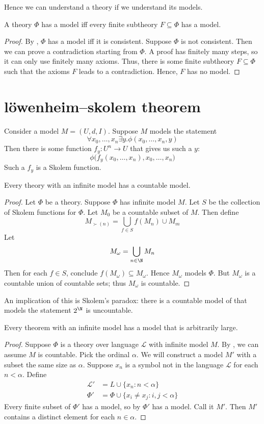 \documentclass{scrbook}
\begin{document}
Hence we can understand a theory if we understand its models. 
\begin{theorem}
  A theory $\Phi$ has a model iff every finite subtheory $F\subseteq \Phi$ has a model.
\end{theorem}
\begin{proof}
  By , $\Phi$ has a model iff it is consistent. Suppose $\Phi$ is not consistent. Then we can prove a contradiction starting from $\Phi$. A proof has finitely many steps, so it can only use finitely many axioms. Thus, there is some finite subtheory $F\subseteq \Phi$ such that the axioms $F$ leads to a contradiction. Hence, $F$ has no model. 
\end{proof}
\section[Löwenheim–Skolem theorem]{löwenheim–skolem theorem}
\begin{defn}
  Consider a model $M=(U,d,I)$. Suppose $M$ models the statement
  \[
  \forall x_0,\dots, x_n \exists y . \phi(x_0,\dots,x_n,y)
  \]
  Then there is some function $f_y:U^n\to U$ that gives us such a $y$:
  \[
  \phi\bigl(f_y(x_0,\dots, x_n),x_0,\dots, x_n\bigr)
  \]
  Such a $f_y$ is a Skolem function. 
\end{defn}
\begin{theorem}\label{th:ls-down}
  Every theory with an infinite model has a countable model. 
\end{theorem}
\begin{proof}
  Let $\Phi$ be a theory. Suppose $\Phi$ has infinite model $M$. Let $S$ be the collection of Skolem functions for $\Phi$. Let $M_0$ be a countable subset of $M$. Then define
  \[
  M_{\succ(n)} = \bigcup_{f\in S} f(M_n) \cup M_m
  \]
  Let
  \[
  M_\omega = \bigcup_{n\in \N} M_n
  \]
  Then for each $f\in S$, conclude $f(M_\omega)\subseteq M_\omega$. Hence $M_\omega$ models $\Phi$. But $M_\omega$ is a countable union of countable sets; thus $M_\omega$ is countable. 
\end{proof}
An implication of this is Skolem's paradox: there is a countable model of \zfc that models the statement $2^\N$ is uncountable. 
\begin{theorem}
  Every theorem with an infinite model has a model that is arbitrarily large.
\end{theorem}
\begin{proof}
  Suppose $\Phi$ is a theory over language $\mathcal L$ with infinite model $M$. By , we can assume $M$ is countable. Pick the ordinal $\alpha$. We will construct a model $M'$ with a subset the same size as $\alpha$. Suppose $x_n$ is a symbol not in the language $\mathcal L$ for each $n<\alpha$. Define
  \begin{align*}
    \mathcal L' &= L \cup \{x_n:n< \alpha\} \\
    \Phi' &= \Phi \cup \{x_i \neq x_j : i,j < \alpha\}
  \end{align*}
  Every finite subset of $\Phi'$ has a model, so by  $\Phi'$ has a model. Call it $M'$. Then $M'$ contains a distinct element for each $n \in\alpha$. 
\end{proof}
\printbibliography
\end{document}

